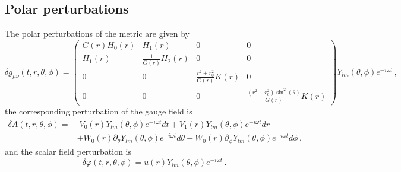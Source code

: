\documentclass[11pt,a4paper]{article}
\begin{document}
\subsection{Polar perturbations}


The polar perturbations of the metric are given by
%
\begin{equation}
    \delta g_{\mu\nu}(t,r,\theta,\phi)=\begin{pmatrix}
G(r)H_0(r) & H_1(r) & 0 & 0\\
H_1(r) & \frac{1}{G(r)}H_2(r) & 0 & 0\\
0 & 0 & \frac{r^2+r_0^2}{G(r)}K(r) & 0\\
0 & 0 & 0 & \frac{(r^2+r_0^2)\sin^2(\theta)}{G(r)}K(r)
\end{pmatrix}Y_{lm}(\theta,\phi)e^{-i\omega t} \,,
\end{equation}
the corresponding perturbation of the gauge field is
%
\begin{equation}\label{deltaA_polar}
\begin{split}
    \delta A(t,r,\theta,\phi)= &\;V_0(r)Y_{lm}(\theta,\phi)e^{-i\omega t}dt+V_1(r)Y_{lm}(\theta,\phi)e^{-i\omega t}dr\\
    & +W_0(r)\partial_{\theta}Y_{lm}(\theta,\phi)e^{-i\omega t}d\theta+W_0(r)\partial_{\phi}Y_{lm}(\theta,\phi)e^{-i\omega t}d\phi \,, 
\end{split}
\end{equation}
and the scalar field perturbation is
\begin{equation}
    \delta\varphi(t,r,\theta,\phi)=u(r)Y_{lm}(\theta,\phi)e^{-i\omega t} \,.
\end{equation}
\end{document}
